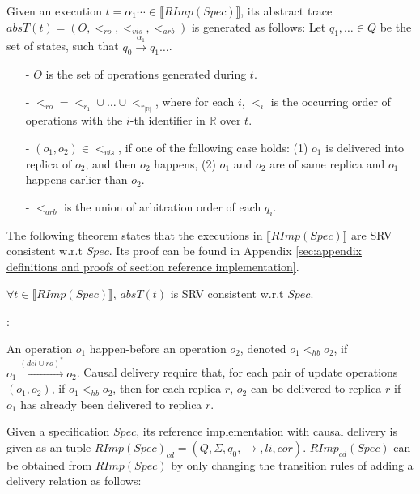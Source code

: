 Given an execution $t = \alpha_1 \cdots \in \llbracket RImp(Spec) \rrbracket$, its abstract trace $absT(t) = (O,<_{\textit{ro}},<_{\textit{vis}},<_{\textit{arb}})$ is generated as follows: Let $q_1,\ldots \in Q$ be the set of states, such that $q_0 {\xrightarrow{\alpha_1}} q_1 \ldots$.

\begin{itemize}
\setlength{\itemsep}{0.5pt}
\item[-] $O$ is the set of operations generated during $t$.

\item[-] $<_{\textit{ro}} = <_{r_1} \cup \ldots \cup <_{r_{\vert \mathbb{R} \vert}}$, where for each $i$, $<_i$ is the occurring order of operations with the $i$-th identifier in $\mathbb{R}$ over $t$.

\item[-] $(o_1,o_2) \in <_{\textit{vis}}$, if one of the following case holds: (1) $o_1$ is delivered into replica of $o_2$, and then $o_2$ happens, (2) $o_1$ and $o_2$ are of same replica and $o_1$ happens earlier than $o_2$.

\item[-] $<_{\textit{arb}}$ is the union of arbitration order of each $q_i$.
\end{itemize}

The following theorem states that the executions in $\llbracket RImp(Spec) \rrbracket$ are SRV consistent w.r.t $Spec$. Its proof can be found in Appendix \ref{sec:appendix definitions and proofs of section reference implementation}.

\begin{theorem}
\label{lemma:executions of reference implementation are SRV consistent}
$\forall t \in \llbracket RImp(Spec) \rrbracket$, $absT(t)$ is SRV consistent w.r.t $Spec$.
\end{theorem}


:

An operation $o_1$ happen-before \cite{Lamport:1978} an operation $o_2$, denoted $o_1 <_{hb} o_2$, if $o_1 {\xrightarrow{ (del \cup ro)^* }} o_2$. Causal delivery require that, for each pair of update operations $(o_1,o_2)$, if $o_1 <_{hb} o_2$, then for each replica $r$, $o_2$ can be delivered to replica $r$ if $o_1$ has already been delivered to replica $r$.

Given a specification $Spec$, its reference implementation with causal delivery is given as an tuple $RImp(Spec)_{\textit{cd}} = (Q,\Sigma,q_0,\rightarrow,li,cor)$. $RImp_{\textit{cd}}(Spec)$ can be obtained from $RImp(Spec)$ by only changing the transition rules of adding a delivery relation as follows:

